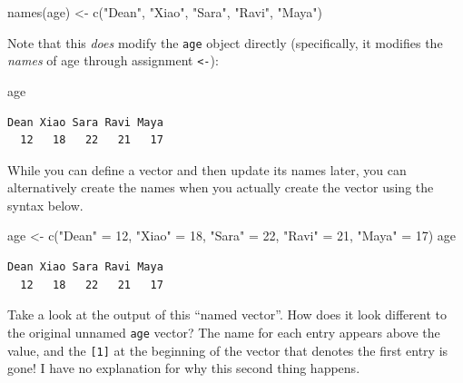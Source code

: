 \documentclass[
  letterpaper,
  DIV=11,
  numbers=noendperiod]{scrreprt}
\newenvironment{Shaded}{\begin{snugshade}}{\end{snugshade}}
\newcommand{\DecValTok}[1]{\textcolor[rgb]{0.68,0.00,0.00}{#1}}
\newcommand{\FunctionTok}[1]{\textcolor[rgb]{0.28,0.35,0.67}{#1}}
\newcommand{\NormalTok}[1]{\textcolor[rgb]{0.00,0.23,0.31}{#1}}
\newcommand{\OtherTok}[1]{\textcolor[rgb]{0.00,0.23,0.31}{#1}}
\newcommand{\StringTok}[1]{\textcolor[rgb]{0.13,0.47,0.30}{#1}}
\begin{document}
\begin{Shaded}
\begin{Highlighting}[]
\FunctionTok{names}\NormalTok{(age) }\OtherTok{\textless{}{-}} \FunctionTok{c}\NormalTok{(}\StringTok{"Dean"}\NormalTok{, }\StringTok{"Xiao"}\NormalTok{, }\StringTok{"Sara"}\NormalTok{, }\StringTok{"Ravi"}\NormalTok{, }\StringTok{"Maya"}\NormalTok{)}
\end{Highlighting}
\end{Shaded}

Note that this \emph{does} modify the \texttt{age} object directly
(specifically, it modifies the \emph{names} of age through assignment
\texttt{\textless{}-}):

\begin{Shaded}
\begin{Highlighting}[]
\NormalTok{age}
\end{Highlighting}
\end{Shaded}

\begin{verbatim}
Dean Xiao Sara Ravi Maya 
  12   18   22   21   17 
\end{verbatim}

While you can define a vector and then update its names later, you can
alternatively create the names when you actually create the vector using
the syntax below.

\begin{Shaded}
\begin{Highlighting}[]
\NormalTok{age }\OtherTok{\textless{}{-}} \FunctionTok{c}\NormalTok{(}\StringTok{"Dean"} \OtherTok{=} \DecValTok{12}\NormalTok{, }\StringTok{"Xiao"} \OtherTok{=} \DecValTok{18}\NormalTok{, }\StringTok{"Sara"} \OtherTok{=} \DecValTok{22}\NormalTok{, }\StringTok{"Ravi"} \OtherTok{=} \DecValTok{21}\NormalTok{, }\StringTok{"Maya"} \OtherTok{=} \DecValTok{17}\NormalTok{)}
\NormalTok{age}
\end{Highlighting}
\end{Shaded}

\begin{verbatim}
Dean Xiao Sara Ravi Maya 
  12   18   22   21   17 
\end{verbatim}

Take a look at the output of this ``named vector''. How does it look
different to the original unnamed \texttt{age} vector? The name for each
entry appears above the value, and the \texttt{{[}1{]}} at the beginning
of the vector that denotes the first entry is gone! I have no
explanation for why this second thing happens.
\end{document}
